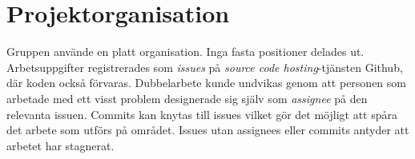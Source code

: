 \section{Projektorganisation}

Gruppen använde en platt organisation. Inga fasta positioner delades ut.
Arbetsuppgifter registrerades som \emph{issues} på \emph{source code hosting}-tjänsten Github,
där koden också förvaras. Dubbelarbete kunde undvikas genom att personen som
arbetade med ett visst problem designerade sig själv som \emph{assignee} på den
relevanta issuen. Commits kan knytas till issues vilket gör det möjligt att
spåra det arbete som utförs på området. Issues utan assignees eller commits
antyder att arbetet har stagnerat.
